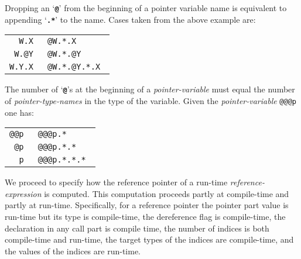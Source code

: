 \documentclass[12pt]{article}
\newcommand{\TT}[1]{{\tt \bfseries #1}}
\begin{document}
Dropping an `\TT{@}' from the beginning of a pointer variable name
is equivalent to appending `\TT{.*}' to the name.  Cases taken
from the above example are:
\begin{center}
\begin{tabular}{r@{~~is equivalent to~~}l}
\tt W.X & \tt @W.*.X \\
\tt W.@Y & \tt @W.*.@Y \\
\tt W.Y.X & \tt @W.*.@Y.*.X \\
\end{tabular}
\end{center}

The number of `\TT{@}'s at the beginning of a {\em pointer-variable}
must equal the number of {\em pointer-type-names} in the type of
the variable.  Given the {\em pointer-variable} {\tt @@@p}
one has:
\begin{center}
\begin{tabular}{r@{~~is equivalent to~~}l}
\tt @@p & \tt @@@p.* \\
\tt @p & \tt @@@p.*.* \\
\tt p & \tt @@@p.*.*.* \\
\end{tabular}
\end{center}

We proceed to specify how the reference pointer of a run-time
{\em reference-expression} is computed.
This computation proceeds partly at compile-time and partly at
run-time.  Specifically, for a reference pointer the pointer part
value is run-time but its type is compile-time, the dereference flag
is compile-time, the declaration in any call part is compile time,
the number of indices is both compile-time and run-time, the target
types of the indices are compile-time, and the values of the indices
are run-time.
\end{document}
